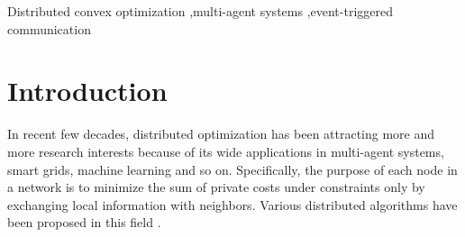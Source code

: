 \documentclass[final,5p,times,twocolumn,authoryear]{elsarticle}
\begin{document}
\begin{frontmatter}



     

\begin{abstract}
In this work we study a distributed optimal output consensus problem for heterogeneous linear multi-agent systems where the agents aim to reach consensus with the purpose of minimizing the sum of private convex costs. Based on output feedback, a fully distributed control law is proposed by using the proportional-integral (PI) control technique. For strongly convex cost functions with Lipschitz gradients, the designed controller can achieve convergence exponentially in an undirected and connected network. 
Furthermore, to remove the requirement of continuous communications, the proposed control law is then extended to periodic and event-triggered communication schemes, which also achieve convergence exponentially. Two simulation examples are given to verify the proposed control algorithms.
\end{abstract}



\begin{keyword}
Distributed convex optimization \sep multi-agent systems \sep event-triggered communication


\end{keyword}

\end{frontmatter}


\section{Introduction}\label{int}
In recent few decades, distributed optimization has been attracting more and more research interests because of its wide applications in multi-agent systems, smart grids, machine learning and so on. Specifically, the purpose of each node in a network is to minimize the sum of private costs under constraints only by exchanging local information with neighbors. Various distributed algorithms have been proposed in this field \citep{nedic2009,yang2019,zhang2017,tang2019,zhao2017,li20191,li20192}.
\end{document}
